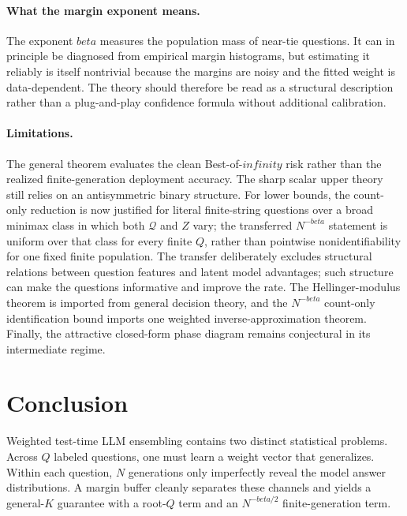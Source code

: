 \documentclass[11pt]{article}
\def\beta{beta}%
\def\infty{infinity}%
\newcommand{\calQ}{\mathcal Q}
\begin{document}
\paragraph{What the margin exponent means.}
The exponent $\beta$ measures the population mass of near-tie questions.  It can in principle be diagnosed from empirical margin histograms, but estimating it reliably is itself nontrivial because the margins are noisy and the fitted weight is data-dependent.  The theory should therefore be read as a structural description rather than a plug-and-play confidence formula without additional calibration.

\paragraph{Limitations.}
The general theorem evaluates the clean Best-of-$\infty$ risk rather than the realized finite-generation deployment accuracy.  The sharp scalar upper theory still relies on an antisymmetric binary structure.  For lower bounds, the count-only reduction is now justified for literal finite-string questions over a broad minimax class in which both $\calQ$ and $Z$ vary; the transferred $N^{-\beta}$ statement is uniform over that class for every finite $Q$, rather than pointwise nonidentifiability for one fixed finite population.  The transfer deliberately excludes structural relations between question features and latent model advantages; such structure can make the questions informative and improve the rate.  The Hellinger-modulus theorem is imported from general decision theory, and the $N^{-\beta}$ count-only identification bound imports one weighted inverse-approximation theorem.  Finally, the attractive closed-form phase diagram remains conjectural in its intermediate regime.

\section{Conclusion}

Weighted test-time LLM ensembling contains two distinct statistical problems.  Across $Q$ labeled questions, one must learn a weight vector that generalizes.  Within each question, $N$ generations only imperfectly reveal the model answer distributions.  A margin buffer cleanly separates these channels and yields a general-$K$ guarantee with a root-$Q$ term and an $N^{-\beta/2}$ finite-generation term.
\end{document}
